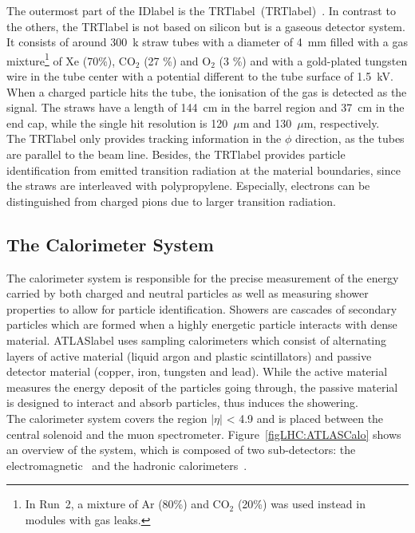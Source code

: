 The outermost part of the \acrshort{IDlabel} is the \acrlong{TRTlabel}~(\acrshort{TRTlabel})~\cite{MITSOU_2004,TRTRun1}. In contrast to the others, the \acrshort{TRTlabel} is not based on silicon but is a gaseous detector system. It consists of around 300~k straw tubes with a diameter of 4~mm filled with a gas mixture\footnote{In Run~2, a mixture of Ar (80\%) and CO$_2$ (20\%) was used instead in modules with gas leaks.} of Xe (70\%), CO$_2$ (27 \%) and O$_2$ (3 \%) and with a gold-plated tungsten wire in the tube center with a potential different to the tube surface of 1.5~kV. When a charged particle hits the tube, the ionisation of the gas is detected as the signal. The straws have a length of 144~cm in the barrel region and 37~cm in the end cap, while the single hit resolution is 120~$\mu$m and 130~$\mu$m, respectively.\\

The \acrshort{TRTlabel} only provides tracking information in the $\phi$ direction, as the tubes are parallel to the beam line. Besides, the \acrshort{TRTlabel} provides particle identification from emitted transition radiation at the material boundaries, since the straws are interleaved with polypropylene. Especially, electrons can be distinguished from charged pions due to larger transition radiation.


\subsection{The Calorimeter System}

The calorimeter system is responsible for the precise measurement of the energy carried by both charged and neutral particles as well as measuring shower properties to allow for particle identification. Showers are cascades of secondary particles which are formed when a highly energetic particle interacts with dense material. \acrshort{ATLASlabel} uses sampling calorimeters which consist of alternating layers of active material (liquid argon and plastic scintillators) and passive detector material (copper, iron, tungsten and lead). While the active material measures the energy deposit of the particles going through, the passive material is designed to interact and absorb particles, thus induces the showering.\\

The calorimeter system covers the region $|\eta|$ < 4.9 and is placed between the central solenoid and the muon spectrometer. Figure~\ref{figLHC:ATLASCalo} shows an overview of the system, which is composed of two sub-detectors: the electromagnetic~\cite{CERN-LHCC-96-041,CERN-LHCC-2017-018} and the hadronic calorimeters~\cite{CERN-LHCC-96-042}. 

